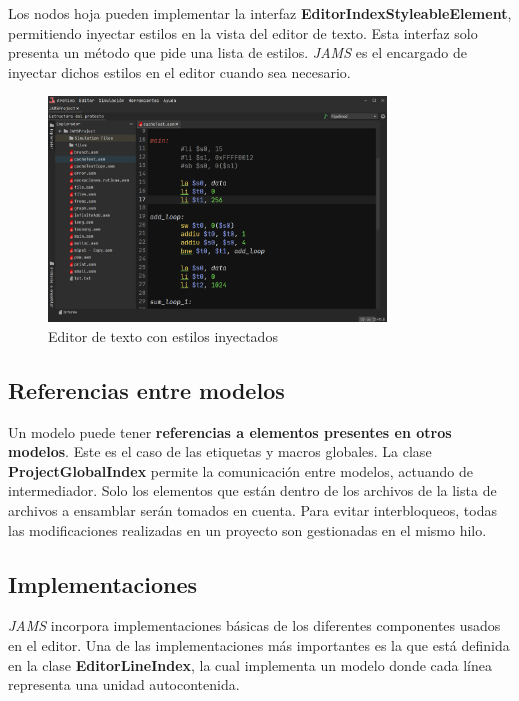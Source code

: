 \noindent Los nodos hoja pueden implementar la interfaz
\textbf{EditorIndexStyleableElement}, permitiendo inyectar
estilos en la vista del editor de texto.
Esta interfaz solo presenta un método que pide una lista
de estilos.
\textit{JAMS} es el encargado de inyectar dichos estilos
en el editor cuando sea necesario.

\begin{figure}[H]
    \centering
    \includegraphics[width=0.8\textwidth]{images/base/jams-text-editor}
    \caption{Editor de texto con estilos inyectados}
    \label{fig:jams-editor-texto}
\end{figure}

\subsection{Referencias entre modelos}\label{subsec:referencias-entre-modelos}

Un modelo puede tener \textbf{referencias a elementos
presentes en otros modelos}.
Este es el caso de las etiquetas y macros globales.
La clase \textbf{ProjectGlobalIndex} permite la
comunicación entre modelos, actuando de intermediador.
Solo los elementos que están dentro de los archivos
de la lista de archivos a ensamblar serán tomados en cuenta.
Para evitar interbloqueos, todas las modificaciones
realizadas en un proyecto son gestionadas en el
mismo hilo.

\subsection{Implementaciones}\label{subsec:implementaciones}

\textit{JAMS} incorpora implementaciones básicas de los
diferentes componentes usados en el editor.
Una de las implementaciones más importantes es la que está
definida en la clase \textbf{EditorLineIndex}, la cual
implementa un modelo donde cada línea representa una
unidad autocontenida.

